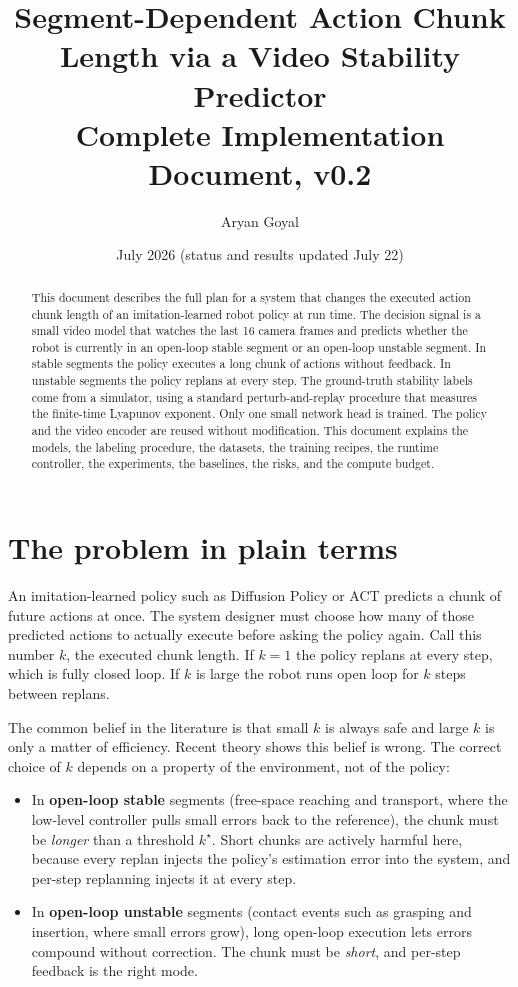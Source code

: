 \documentclass[11pt]{article}
\title{Segment-Dependent Action Chunk Length via a Video Stability Predictor\\
\large Complete Implementation Document, v0.2}
\author{Aryan Goyal}
\date{July 2026 (status and results updated July 22)}
\newcommand{\kstar}{k^{\star}}
\begin{document}
\maketitle

\begin{abstract}
\noindent
This document describes the full plan for a system that changes the executed action chunk
length of an imitation-learned robot policy at run time. The decision signal is a small
video model that watches the last 16 camera frames and predicts whether the robot is
currently in an open-loop stable segment or an open-loop unstable segment. In stable
segments the policy executes a long chunk of actions without feedback. In unstable
segments the policy replans at every step. The ground-truth stability labels come from a
simulator, using a standard perturb-and-replay procedure that measures the finite-time
Lyapunov exponent. Only one small network head is trained. The policy and the video
encoder are reused without modification. This document explains the models, the labeling
procedure, the datasets, the training recipes, the runtime controller, the experiments,
the baselines, the risks, and the compute budget.
\end{abstract}

\tableofcontents
\newpage

\section{The problem in plain terms}

An imitation-learned policy such as Diffusion Policy or ACT predicts a chunk of future
actions at once. The system designer must choose how many of those predicted actions to
actually execute before asking the policy again. Call this number $k$, the executed chunk
length. If $k=1$ the policy replans at every step, which is fully closed loop. If $k$ is
large the robot runs open loop for $k$ steps between replans.

The common belief in the literature is that small $k$ is always safe and large $k$ is
only a matter of efficiency. Recent theory shows this belief is wrong. The correct choice
of $k$ depends on a property of the environment, not of the policy:

\begin{itemize}[leftmargin=2em]
  \item In \textbf{open-loop stable} segments (free-space reaching and transport, where
        the low-level controller pulls small errors back to the reference), the chunk
        must be \emph{longer} than a threshold $\kstar$. Short chunks are actively
        harmful here, because every replan injects the policy's estimation error into
        the system, and per-step replanning injects it at every step.
  \item In \textbf{open-loop unstable} segments (contact events such as grasping and
        insertion, where small errors grow), long open-loop execution lets errors
        compound without correction. The chunk must be \emph{short}, and per-step
        feedback is the right mode.
\end{itemize}
\end{document}
